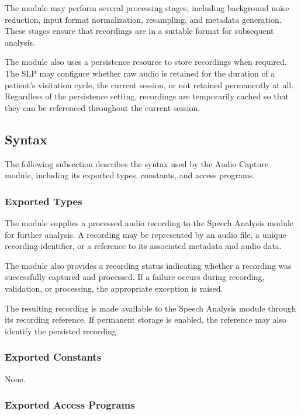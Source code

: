 \documentclass[12pt, titlepage]{article}
\begin{document}
The module may perform several processing stages, including background noise reduction, input format normalization, resampling, and metadata generation. These stages ensure that recordings are in a suitable format for subsequent analysis.

The module also uses a persistence resource to store recordings when required. The SLP may configure whether raw audio is retained for the duration of a patient's visitation cycle, the current session, or not retained permanently at all. Regardless of the persistence setting, recordings are temporarily cached so that they can be referenced throughout the current session.

\subsection{Syntax}

The following subsection describes the syntax used by the Audio Capture module, including its exported types, constants, and access programs.

\subsubsection{Exported Types}

The module supplies a processed audio recording to the Speech Analysis module for further analysis. A recording may be represented by an audio file, a unique recording identifier, or a reference to its associated metadata and audio data.

The module also provides a recording status indicating whether a recording was successfully captured and processed. If a failure occurs during recording, validation, or processing, the appropriate exception is raised.

The resulting recording is made available to the Speech Analysis module through its recording reference. If permanent storage is enabled, the reference may also identify the persisted recording.

\subsubsection{Exported Constants}

None.

\subsubsection{Exported Access Programs}
\end{document}
